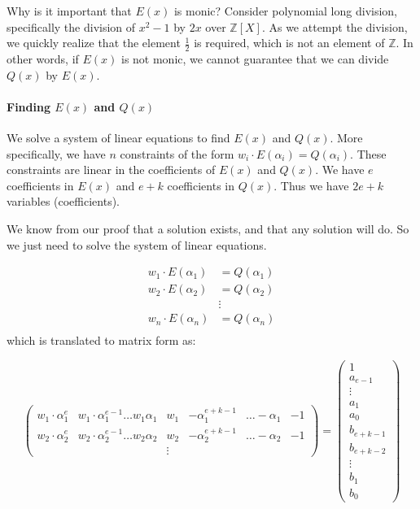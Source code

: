 \begin{bclogo}[logo=\bcquestion]{Why is it important that $E(x)$ is monic?}
    Consider polynomial long division, specifically 
    the division of $x^2-1$ by $2x$ over $\mathbb{Z}[X]$. 
    As we attempt the division, we quickly realize that the element 
    $\frac{1}{2}$ is required, which is not an element of $\mathbb{Z}$. 
    In other words, if $E(x)$ is not monic, we cannot guarantee 
    that we can divide $Q(x)$ by $E(x)$.
\end{bclogo}

\paragraph{Finding $E(x)$ and $Q(x)$}

We solve a system of linear equations to find $E(x)$ and $Q(x)$.
More specifically, we have $n$ constraints of the form $w_i\cdot E(\alpha_i)=Q(\alpha_i)$.
These constraints are linear in the coefficients of $E(x)$ and $Q(x)$.
We have $e$ coefficients in $E(x)$ and $e+k$ coefficients in $Q(x)$. Thus 
we have $2e+k$ variables (coefficients).

We know from our proof that a solution exists, and that any solution will do.
So we just need to solve the system of linear equations.

\begin{align*}
    w_1\cdot E(\alpha_1) &= Q(\alpha_1)\\
    w_2\cdot E(\alpha_2) &= Q(\alpha_2)\\
    &\vdots\\
    w_n\cdot E(\alpha_n) &= Q(\alpha_n)\\
\end{align*}
which is translated to matrix form as:

\[
    \left(\begin{array}{ccc|lcc}
        w_{1}\cdot\alpha_{1}^{e} & w_{1}\cdot\alpha_{1}^{e-1}\dots w_{1}\alpha_{1} & w_{1} & -\alpha_{1}^{e+k-1} & \dots-\alpha_{1} & -1\\
        w_{2}\cdot\alpha_{2}^{e} & w_{2}\cdot\alpha_{2}^{e-1}\dots w_{2}\alpha_{2} & w_{2} & -\alpha_{2}^{e+k-1} & \dots-\alpha_{2} & -1\\
         &  & \vdots
        \end{array}\right)=\left(\begin{array}{c}
        1\\
        a_{e-1}\\
        \vdots\\
        a_{1}\\
        a_{0}\\
        \hline b_{e+k-1}\\
        b_{e+k-2}\\
        \vdots\\
        b_{1}\\
        b_{0}
        \end{array}\right)
\]

